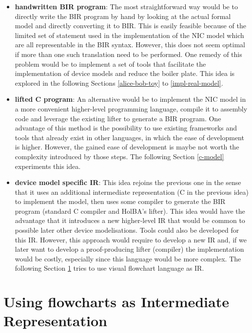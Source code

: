 \documentclass{kththesis}
\begin{document}
\begin{itemize}
    \item \textbf{handwritten BIR program}: The most straightforward way would be to directly write the BIR program by hand by looking at the actual formal model and directly converting it to BIR. This is easily feasible because of the limited set of statement used in the implementation of the NIC model which are all representable in the BIR syntax. However, this does not seem optimal if more than one such translation need to be performed. One remedy of this problem would be to implement a set of tools that facilitate the implementation of device models and reduce the boiler plate. This idea is explored in the following Sections \ref{alice-bob-toy} to \ref{impl-real-model}.
    \item \textbf{lifted C program}: An alternative would be to implement the NIC model in a more convenient higher-level programming language, compile it to assembly code and leverage the existing lifter to generate a BIR program. One advantage of this method is the possibility to use existing frameworks and tools that already exist in other languages, in which the ease of development is higher. However, the gained ease of development is maybe not worth the complexity introduced by those steps. The following Section \ref{c-model} experiments this idea.
    \item \textbf{device model specific \gls{IR}}: This idea rejoins the previous one in the sense that it uses an additional intermediate representation (C in the previous idea) to implement the model, then uses some compiler to generate the BIR program (standard C compiler and HolBA's lifter). This idea would have the advantage that it introduces a new higher-level IR that would be common to possible later other device modelisations. Tools could also be developed for this IR. However, this approach would require to develop a new IR and, if we later want to develop a \gls{proof-producing} lifter (compiler) the implementation would be costly, especially since this language would be more complex. The following Section \ref{flowchart-attempt} tries to use visual flowchart language as IR. %
\end{itemize}

\section{Using flowcharts as Intermediate Representation} \label{flowchart-attempt}
\end{document}
